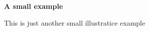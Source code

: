 \documentclass{article}
\begin{document}
\begin{huge}
\bfseries
A small example

\end{huge}
\bigskip
This is just another small illustratice example
\end{document}
